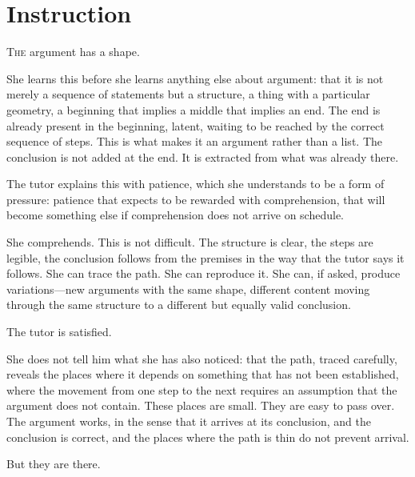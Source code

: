 
\chapter{Instruction}


\lettrine{T}{he} argument has a shape.

She learns this before she learns anything else about argument:
that it is not merely a sequence of statements but a structure,
a thing with a particular geometry, a beginning that implies
a middle that implies an end. The end is already present in
the beginning, latent, waiting to be reached by the correct
sequence of steps. This is what makes it an argument rather
than a list. The conclusion is not added at the end. It is
extracted from what was already there.

The tutor explains this with patience, which she understands
to be a form of pressure: patience that expects to be rewarded
with comprehension, that will become something else if
comprehension does not arrive on schedule.

She comprehends. This is not difficult. The structure is clear,
the steps are legible, the conclusion follows from the premises
in the way that the tutor says it follows. She can trace the
path. She can reproduce it. She can, if asked, produce
variations---new arguments with the same shape, different
content moving through the same structure to a different but
equally valid conclusion.

The tutor is satisfied.

She does not tell him what she has also noticed: that the
path, traced carefully, reveals the places where it depends
on something that has not been established, where the
movement from one step to the next requires an assumption
that the argument does not contain. These places are small.
They are easy to pass over. The argument works, in the sense
that it arrives at its conclusion, and the conclusion is
correct, and the places where the path is thin do not prevent
arrival.

But they are there.

\section{}

